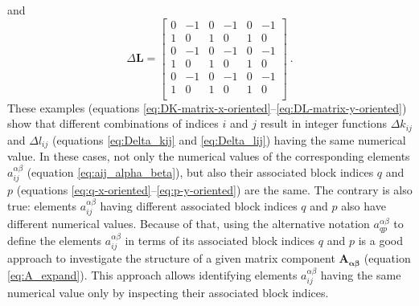 \documentclass[manuscript]{geophysics}
\begin{document}
	and
	\begin{equation}
		\Delta\mathbf{L} = \begin{bmatrix}
			0 &  -1 &   0 &  -1 &   0 &  -1 \\
			1 &   0 &   1 &   0 &   1 &   0 \\
			0 &  -1 &   0 &  -1 &   0 &  -1 \\
			1 &   0 &   1 &   0 &   1 &   0 \\
			0 &  -1 &   0 &  -1 &   0 &  -1 \\
			1 &   0 &   1 &   0 &   1 &   0 \\
		\end{bmatrix} \: .
		\label{eq:DL-matrix-y-oriented}
	\end{equation}
	These examples (equations \ref{eq:DK-matrix-x-oriented}--\ref{eq:DL-matrix-y-oriented})
	show that different combinations of indices $i$ and $j$ result in integer functions 
	$\Delta k_{ij}$ and $\Delta l_{ij}$ (equations \ref{eq:Delta_kij} and \ref{eq:Delta_lij}) 
	having the same numerical value. In these cases, not only the numerical values of
	the corresponding elements $a^{\alpha\beta}_{ij}$ (equation \ref{eq:aij_alpha_beta}),
	but also their associated block indices $q$ and $p$ (equations 
	\ref{eq:q-x-oriented}--\ref{eq:p-y-oriented}) are the same. 
	The contrary is also true: elements $a^{\alpha\beta}_{ij}$ having different 
	associated block indices $q$ and $p$ also have different numerical values.
	Because of that, using the alternative notation $a^{\alpha\beta}_{qp}$ to define the elements 
	$a^{\alpha\beta}_{ij}$ in terms of its associated block indices $q$ and $p$ is a good
	approach to investigate the structure of a given matrix component 
	$\mathbf{A_{\boldsymbol{\alpha\beta}}}$ (equation \ref{eq:A_expand}).
	This approach allows identifying elements $a^{\alpha\beta}_{ij}$ having the same numerical
	value only by inspecting their associated block indices.
	
\end{document}
